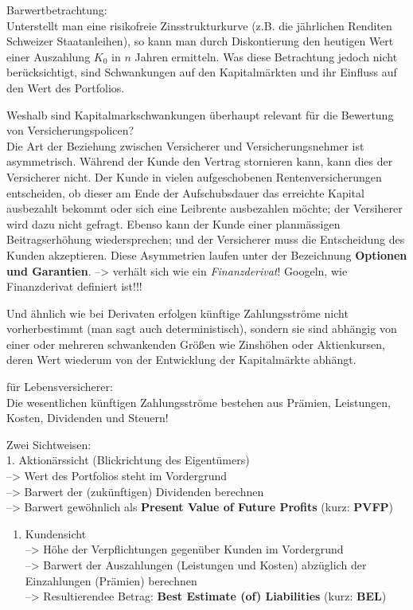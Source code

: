 \documentclass[
]{article}
\providecommand{\tightlist}{%
  \setlength{\itemsep}{0pt}\setlength{\parskip}{0pt}}
\begin{document}
Barwertbetrachtung:\\
Unterstellt man eine risikofreie Zinsstrukturkurve (z.B. die jährlichen
Renditen Schweizer Staatanleihen), so kann man durch Diskontierung den
heutigen Wert einer Auszahlung \(K_0\) in \(n\) Jahren ermitteln. Was
diese Betrachtung jedoch nicht berücksichtigt, sind Schwankungen auf den
Kapitalmärkten und ihr Einfluss auf den Wert des Portfolios.

Weshalb sind Kapitalmarkschwankungen überhaupt relevant für die
Bewertung von Versicherungspolicen?\\
Die Art der Beziehung zwischen Versicherer und Versicherungsnehmer ist
asymmetrisch. Während der Kunde den Vertrag stornieren kann, kann dies
der Versicherer nicht. Der Kunde in vielen aufgeschobenen
Rentenversicherungen entscheiden, ob dieser am Ende der Aufschubsdauer
das erreichte Kapital ausbezahlt bekommt oder sich eine Leibrente
ausbezahlen möchte; der Versiherer wird dazu nicht gefragt. Ebenso kann
der Kunde einer planmässigen Beitragserhöhung wiedersprechen; und der
Versicherer muss die Entscheidung des Kunden akzeptieren. Diese
Asymmetrien laufen unter der Bezeichnung \textbf{Optionen und
Garantien}. --\textgreater{} verhält sich wie ein \emph{Finanzderivat}!
Googeln, wie Finanzderivat definiert ist!!!

Und ähnlich wie bei Derivaten erfolgen künftige Zahlungsströme nicht
vorherbestimmt (man sagt auch deterministisch), sondern sie sind
abhängig von einer oder mehreren schwankenden Größen wie Zinshöhen oder
Aktienkursen, deren Wert wiederum von der Entwicklung der Kapitalmärkte
abhängt.

für Lebensversicherer:\\
Die wesentlichen künftigen Zahlungsströme bestehen aus Prämien,
Leistungen, Kosten, Dividenden und Steuern!

Zwei Sichtweisen:\\
1. Aktionärssicht (Blickrichtung des Eigentümers)\\
--\textgreater{} Wert des Portfolios steht im Vordergrund\\
--\textgreater{} Barwert der (zukünftigen) Dividenden berechnen\\
--\textgreater{} Barwert gewöhnlich als \textbf{Present Value of Future
Profits} (kurz: \textbf{PVFP})

\begin{enumerate}
\def\labelenumi{\arabic{enumi}.}
\setcounter{enumi}{1}
\tightlist
\item
  Kundensicht\\
  --\textgreater{} Höhe der Verpflichtungen gegenüber Kunden im
  Vordergrund\\
  --\textgreater{} Barwert der Auszahlungen (Leistungen und Kosten)
  abzüglich der Einzahlungen (Prämien) berechnen\\
  --\textgreater{} Resultierendee Betrag: \textbf{Best Estimate (of)
  Liabilities} (kurz: \textbf{BEL})
\end{enumerate}
\end{document}
